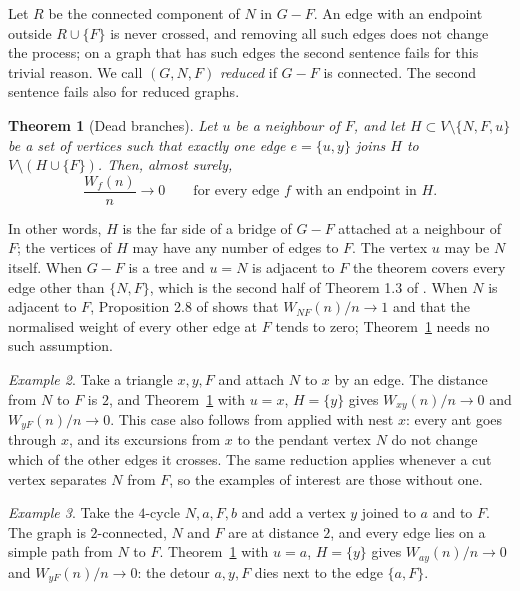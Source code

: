 \documentclass[11pt]{amsart}
\newtheorem{theorem}{Theorem}
\theoremstyle{remark}
\newtheorem{example}[theorem]{Example}
\begin{document}
Let $R$ be the connected component of $N$ in $G-F$. An edge with an endpoint outside $R\cup\{F\}$ is never crossed,
and removing all such edges does not change the process; on a graph that has such edges the second sentence fails for
this trivial reason. We call $(G,N,F)$ \emph{reduced} if $G-F$ is connected. The second sentence fails also for
reduced graphs.

\begin{theorem}[Dead branches]\label{thm:dead}
Let $u$ be a neighbour of $F$, and let $H\subset V\setminus\{N,F,u\}$ be a set of vertices such that exactly one edge
$e=\{u,y\}$ joins $H$ to $V\setminus(H\cup\{F\})$. Then, almost surely,
\[
\frac{W_f(n)}{n}\longrightarrow 0\qquad\text{for every edge $f$ with an endpoint in $H$.}
\]
\end{theorem}

In other words, $H$ is the far side of a bridge of $G-F$ attached at a neighbour of $F$; the vertices of $H$ may have
any number of edges to $F$. The vertex $u$ may be $N$ itself. When $G-F$ is a tree and $u=N$ is adjacent to $F$ the
theorem covers every edge other than $\{N,F\}$, which is the second half of Theorem 1.3 of \cite{KMS}. When $N$ is
adjacent to $F$, Proposition 2.8 of \cite{KMS} shows that $W_{NF}(n)/n\to1$ and that the normalised weight of every
other edge at $F$ tends to zero; Theorem~\ref{thm:dead} needs no such assumption.

\begin{example}\label{ex:paw}
Take a triangle $x,y,F$ and attach $N$ to $x$ by an edge. The distance from $N$ to $F$ is $2$, and
Theorem~\ref{thm:dead} with $u=x$, $H=\{y\}$ gives $W_{xy}(n)/n\to0$ and $W_{yF}(n)/n\to0$. This case also follows
from \cite[Theorem 1.3]{KMS} applied with nest $x$: every ant goes through $x$, and its excursions from $x$ to the
pendant vertex $N$ do not change which of the other edges it crosses. The same reduction applies whenever a
cut vertex separates $N$ from $F$, so the examples of interest are those without one.
\end{example}

\begin{example}\label{ex:c4}
Take the $4$-cycle $N,a,F,b$ and add a vertex $y$ joined to $a$ and to $F$. The graph is $2$-connected, $N$ and $F$
are at distance $2$, and every edge lies on a simple path from $N$ to $F$. Theorem~\ref{thm:dead} with $u=a$,
$H=\{y\}$ gives $W_{ay}(n)/n\to0$ and $W_{yF}(n)/n\to0$: the detour $a,y,F$ dies next to the edge $\{a,F\}$.
\end{example}
\end{document}
